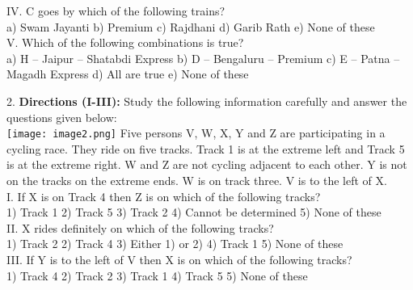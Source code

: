 \documentclass[
]{article}
\begin{document}
IV. C goes by which of the following trains?\\
a) Swam Jayanti \hspace{2mm}b) Premium \hspace{2mm}c) Rajdhani
\hspace{2mm}d) Garib Rath \hspace{2mm}e) None of these\\

V. Which of the following combinations is true?\\
a) H – Jaipur – Shatabdi Express \hspace{2mm}b) D – Bengaluru – Premium
\hspace{2mm}c) E – Patna – Magadh Express \hspace{2mm}d) All are true
\hspace{2mm}e) None of these

2. \textbf{Directions (I-III):} Study the following information carefully and answer the questions given
below:\\
\texttt{[image: image2.png]}
Five persons V, W, X, Y and Z are participating in a cycling race. They ride on five tracks.
Track 1 is at the extreme left and Track 5 is at the extreme right. W and Z are not cycling
adjacent to each other. Y is not on the tracks on the extreme ends. W is on track three. V is to
the left of X.\\

I. If X is on Track 4 then Z is on which of the following tracks?\\
1) Track 1 \hspace{2mm}2) Track 5 \hspace{2mm}3) Track 2
\hspace{2mm}4) Cannot be determined \hspace{2mm}5) None of these\\

II. X rides definitely on which of the following tracks?\\
1) Track 2 \hspace{2mm}2) Track 4 \hspace{2mm}3) Either 1) or 2)
\hspace{2mm}4) Track 1 \hspace{2mm}5) None of these\\

III. If Y is to the left of V then X is on which of the following tracks?\\
1) Track 4 \hspace{2mm}2) Track 2 \hspace{2mm}3) Track 1 \hspace{2mm}4) Track 5 \hspace{2mm}5) None of these\\
\end{document}
